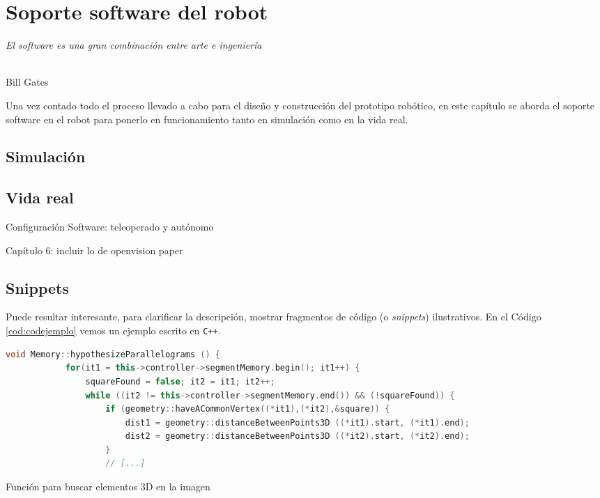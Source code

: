 \chapter{Soporte software del robot}
\label{cap:capitulo6}

\begin{flushright}
\begin{minipage}[]{10cm}
\emph{El software es una gran combinación entre arte e ingeniería}\\
\end{minipage}\\

Bill Gates\\
\end{flushright}

\vspace{1cm}

Una vez contado todo el proceso llevado a cabo para el diseño y construcción del prototipo robótico, en este capítulo se aborda el soporte software en el robot para ponerlo en funcionamiento tanto en simulación como en la vida real.

\section{Simulación}



\section{Vida real}

Configuración 
Software: teleoperado y autónomo

Capítulo 6: incluir lo de openvision paper\\


\section{Snippets}

Puede resultar interesante, para clarificar la descripción, mostrar fragmentos de código (o \textit{snippets}) ilustrativos. En el Código \ref{cod:codejemplo} vemos un ejemplo escrito en \texttt{C++}.

\begin{code}[h]
	\begin{lstlisting}[language=C++]
		void Memory::hypothesizeParallelograms () {
			for(it1 = this->controller->segmentMemory.begin(); it1++) {
				squareFound = false; it2 = it1; it2++;
				while ((it2 != this->controller->segmentMemory.end()) && (!squareFound)) {
					if (geometry::haveACommonVertex((*it1),(*it2),&square)) {
						dist1 = geometry::distanceBetweenPoints3D ((*it1).start, (*it1).end);
						dist2 = geometry::distanceBetweenPoints3D ((*it2).start, (*it2).end);
					}
					// [...]
				\end{lstlisting}
				\caption[Función para buscar elementos 3D en la imagen]{Función para buscar elementos 3D en la imagen}
				\label{cod:codejemplo}
			\end{code}
			
